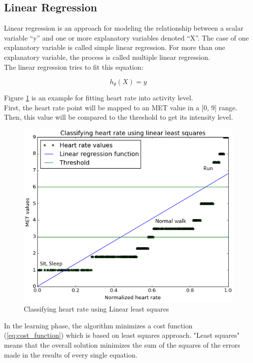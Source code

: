 \documentclass[12pt, a4paper, onecolumn, oneside, parskip=half]{scrartcl}
\begin{document}
\subsection{Linear Regression}

Linear regression is an approach for modeling the relationship between a scalar variable “y” and one or more explanatory variables denoted “X”. The case of one explanatory variable is called simple linear regression. For more than one explanatory variable, the process is called multiple linear regression.\\
The linear regression tries to fit this equation: 

\begin{equation} 
 h_\theta(X)= y
\end{equation}


Figure \ref{Classifying heart rate using Linear least squares} is an example for fitting heart rate into activity level.\\
First, the heart rate point will be mapped to an MET value in a [0, 9] range. Then, this value will be compared to the threshold to get its intensity level.

\begin{figure}[H]
  \centering
  \includegraphics[width=130mm]{pictures/Linear_least_squares_plot.png}
 \caption{Classifying heart rate using Linear least squares} 
 \label{Classifying heart rate using Linear least squares}
\end{figure}

In the learning phase, the algorithm minimizes a cost function (\ref{eq:cost_function}) which is based on least squares approach. "Least squares" means that the overall solution minimizes the sum of the squares of the errors made in the results of every single equation. 
\end{document}
